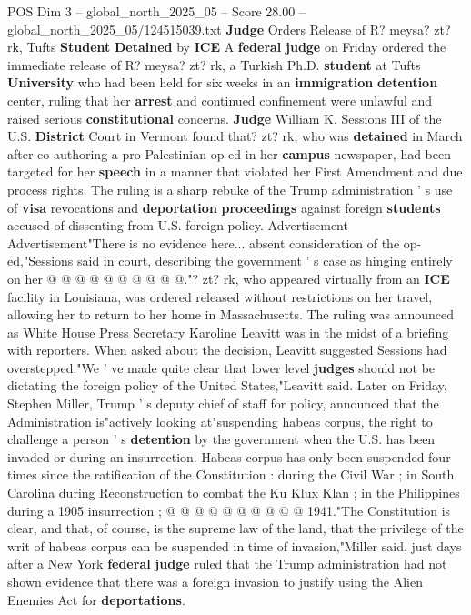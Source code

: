 \begin{textsample}{POS Dim 3 – global\_north\_2025\_05 – Score 28.00 – global\_north\_2025\_05/124515039.txt}  \label{ex:f3_pos_131}
\textbf{Judge} Orders Release of R? meysa? zt? rk, Tufts \textbf{Student} \textbf{Detained} by \textbf{ICE} A \textbf{federal} \textbf{judge} on Friday ordered the immediate release of R? meysa? zt? rk, a Turkish Ph.D. \textbf{student} at Tufts \textbf{University} who had been held for six weeks in an \textbf{immigration} \textbf{detention} center, ruling that her \textbf{arrest} and continued confinement were unlawful and raised serious \textbf{constitutional} concerns. \textbf{Judge} William K.
Sessions III of the U.S. \textbf{District} Court in Vermont found that? zt? rk, who was \textbf{detained} in March after co-authoring a pro-Palestinian op-ed in her \textbf{campus} newspaper, had been targeted for her \textbf{speech} in a manner that violated her First Amendment and due process rights.
The ruling is a sharp rebuke of the Trump administration ' s use of \textbf{visa} revocations and \textbf{deportation} \textbf{proceedings} against foreign \textbf{students} accused of dissenting from U.S. foreign policy.
Advertisement Advertisement"There is no evidence here... absent consideration of the op-ed,"Sessions said in court, describing the government ' s case as hinging entirely on her @ @ @ @ @ @ @ @ @ @."? zt? rk, who appeared virtually from an \textbf{ICE} facility in Louisiana, was ordered released without restrictions on her travel, allowing her to return to her home in Massachusetts.
The ruling was announced as White House Press Secretary Karoline Leavitt was in the midst of a briefing with reporters.
When asked about the decision, Leavitt suggested Sessions had overstepped."We ' ve made quite clear that lower level \textbf{judges} should not be dictating the foreign policy of the United States,"Leavitt said.
Later on Friday, Stephen Miller, Trump ' s deputy chief of staff for policy, announced that the Administration is"actively looking at"suspending habeas corpus, the right to challenge a person ' s \textbf{detention} by the government when the U.S. has been invaded or during an insurrection.
Habeas corpus has only been suspended four times since the ratification of the Constitution : during the Civil War ; in South Carolina during Reconstruction to combat the Ku Klux Klan ; in the Philippines during a 1905 insurrection ; @ @ @ @ @ @ @ @ @ @ 1941."The Constitution is clear, and that, of course, is the supreme law of the land, that the privilege of the writ of habeas corpus can be suspended in time of invasion,"Miller said, just days after a New York \textbf{federal} \textbf{judge} ruled that the Trump administration had not shown evidence that there was a foreign invasion to justify using the Alien Enemies Act for \textbf{deportations}.

\end{textsample}
